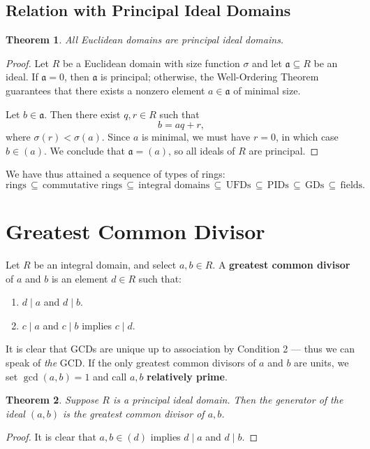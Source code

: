 \documentclass[11pt]{article}
\newtheorem{theorem}{Theorem}
\begin{document}
\subsection{Relation with Principal Ideal Domains}

\begin{adjustwidth}{0.5cm}{}
  \begin{theorem}
    All Euclidean domains are principal ideal domains.
  \end{theorem}
  \begin{proof}
    Let $R$ be a Euclidean domain with size function $\sigma$ and let $\mathfrak{a} \subseteq R$ be an ideal. If $\mathfrak{a} = 0$, then $\mathfrak{a}$ is principal; otherwise, the Well-Ordering Theorem guarantees that there exists a nonzero element $a \in \mathfrak{a}$ of minimal size.

    Let $b \in \mathfrak{a}$. Then there exist $q, r \in R$ such that
    \[
      b = aq + r,
    \]
    where $\sigma(r) < \sigma(a)$. Since $a$ is minimal, we must have $r = 0$, in which case $b \in (a)$. We conclude that $\mathfrak{a} = (a)$, so all ideals of $R$ are principal.
  \end{proof}
\end{adjustwidth}

We have thus attained a sequence of types of rings:
\[
  \text{rings} \, \subseteq \, \text{commutative rings} \, \subseteq \, \text{integral domains} \, \subseteq \, \text{UFDs} \, \subseteq \, \text{PIDs} \, \subseteq \, \text{GDs} \, \subseteq \, \text{fields}.
\]


\section{Greatest Common Divisor}

Let $R$ be an integral domain, and select $a, b \in R$. A \textbf{greatest common divisor} of $a$ and $b$ is an element $d \in R$ such that:
\begin{enumerate}
  \item $d \mid a$ and $d \mid b$.
  \item $c \mid a$ and $c \mid b$ implies $c \mid d$.
\end{enumerate}
It is clear that GCDs are unique up to association by Condition 2 --- thus we can speak of \textit{the} GCD. If the only greatest common divisors of $a$ and $b$ are units, we set $\gcd(a, b) = 1$ and call $a, b$ \textbf{relatively prime}.

\begin{adjustwidth}{0.5cm}{}
  \begin{theorem}
    Suppose $R$ is a principal ideal domain. Then the generator of the ideal $(a, b)$ is the greatest common divisor of $a, b$.
  \end{theorem}
  \begin{proof}
    It is clear that $a, b \in (d)$ implies $d \mid a$ and $d \mid b$.
  \end{proof}
\end{adjustwidth}

\end{document}
